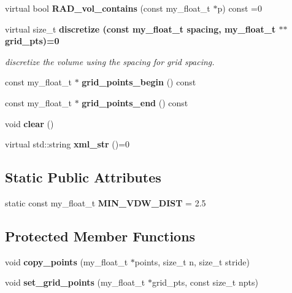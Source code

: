 \begin{CompactItemize}
\item 
virtual bool \textbf{RAD\_\-vol\_\-contains} (const my\_\-float\_\-t $\ast$p) const =0\label{classSimSite3D_1_1BoundingVolume_c7aa46af4a8298a435da9b8f04c6640f}

\item 
virtual size\_\-t \bf{discretize} (const my\_\-float\_\-t spacing, my\_\-float\_\-t $\ast$$\ast$grid\_\-pts)=0\label{classSimSite3D_1_1BoundingVolume_3e29c82e9883e18e948de572c28f778e}

\begin{CompactList}\small\item\em discretize the volume using the spacing for grid spacing. \item\end{CompactList}\item 
const my\_\-float\_\-t $\ast$ \textbf{grid\_\-points\_\-begin} () const \label{classSimSite3D_1_1BoundingVolume_6bbd9d6cfc903cc3684e9a8d4b6c4609}

\item 
const my\_\-float\_\-t $\ast$ \textbf{grid\_\-points\_\-end} () const \label{classSimSite3D_1_1BoundingVolume_bcd2ff2e80f5bdbd3838a589672caa92}

\item 
void \textbf{clear} ()\label{classSimSite3D_1_1BoundingVolume_238de4a44b0b1fd68bd3379f5abdb02c}

\item 
virtual std::string \textbf{xml\_\-str} ()=0\label{classSimSite3D_1_1BoundingVolume_edfa3d6c9da7269a8cc3b3361e1fce4b}

\end{CompactItemize}
\subsection*{Static Public Attributes}
\begin{CompactItemize}
\item 
static const my\_\-float\_\-t \textbf{MIN\_\-VDW\_\-DIST} = 2.5\label{classSimSite3D_1_1BoundingVolume_16eb8d31fe37eb14bf9b18f571cd32ad}

\end{CompactItemize}
\subsection*{Protected Member Functions}
\begin{CompactItemize}
\item 
void \textbf{copy\_\-points} (my\_\-float\_\-t $\ast$points, size\_\-t n, size\_\-t stride)\label{classSimSite3D_1_1BoundingVolume_276a47b97596ef8062112b0399e3c27c}

\item 
void \textbf{set\_\-grid\_\-points} (my\_\-float\_\-t $\ast$grid\_\-pts, const size\_\-t npts)\label{classSimSite3D_1_1BoundingVolume_9955a12346fe57b4a1a9bcc116a14c67}

\end{CompactItemize}
